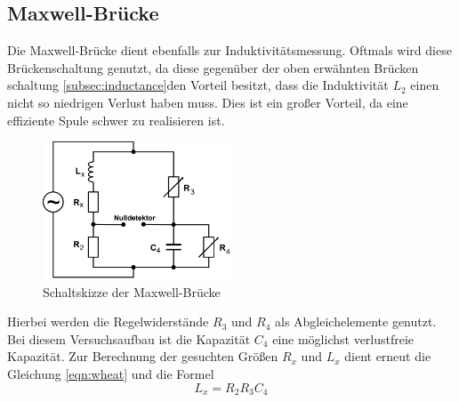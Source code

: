 \subsection{Maxwell-Brücke}
Die Maxwell-Brücke dient ebenfalls zur Induktivitätsmessung. Oftmals wird diese Brückenschaltung genutzt, da diese gegenüber der oben erwähnten Brücken
schaltung \ref{subsec:inductance}den Vorteil besitzt, dass die Induktivität $L_2$ einen nicht so niedrigen Verlust haben muss. Dies ist ein großer Vorteil, da eine 
effiziente Spule schwer zu realisieren ist.
\begin{figure}
    \centering
    \caption{Schaltskizze der Maxwell-Brücke}
    \label{fig:maxwell}
    \includegraphics[width=0.5\textwidth]{bridges/maxwell.png}
\end{figure}
Hierbei werden die Regelwiderstände $R_3$ und $R_4$ als Abgleichelemente genutzt. Bei diesem Versuchsaufbau ist die Kapazität $C_4$ eine möglichst verlustfreie 
Kapazität. Zur Berechnung der gesuchten Größen $R_x$ und $L_x$ dient erneut die Gleichung \eqref{eqn:wheat} und die Formel
\begin{equation}
    L_x = R_2 R_3 C_4
\end{equation}
